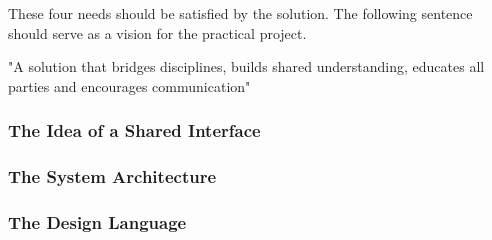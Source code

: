 These four needs should be satisfied by the solution. The following sentence should serve as a
vision for the practical project.

"A solution that bridges disciplines, builds shared understanding, educates all parties and
encourages communication"

\subsubsection{The Idea of a Shared Interface}


\subsubsection{The System Architecture}

\subsubsection{The Design Language}